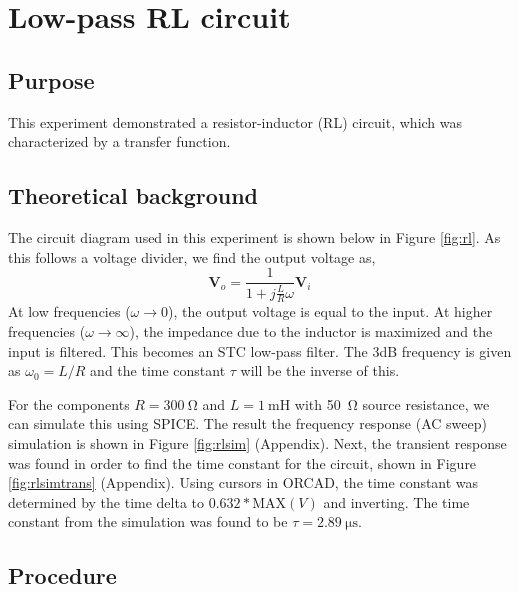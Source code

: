 \documentclass{report}
\begin{document}
\pagebreak

\section{Low-pass RL circuit}
\subsection{Purpose}
This experiment demonstrated a resistor-inductor (RL) circuit, which was characterized by a transfer function. 
\subsection{Theoretical background}
The circuit diagram used in this experiment is shown below in Figure \ref{fig:rl}. As this follows a voltage divider, we find the output voltage as, 
\begin{equation}
	\mathbf{V}_o = \frac{1}{1 + j \frac{L}{R} \omega} \mathbf{V}_i
\end{equation}
At low frequencies ($\omega \to 0$), the output voltage is equal to the input. At higher frequencies ($\omega \to \infty$), the impedance due to the inductor is maximized and the input is filtered. This becomes an STC low-pass filter. The 3dB frequency is given as $\omega_0 = L/R$ and the time constant $\tau$ will be the inverse of this. 

For the components $R=\SI{300}{\ohm}$ and $L=\SI{1}{\milli\henry}$ with \SI{50}{\ohm} source resistance, we can simulate this using SPICE. The result the frequency response (AC sweep) simulation is shown in Figure \ref{fig:rlsim} (Appendix). Next, the transient response was found in order to find the time constant for the circuit, shown in Figure \ref{fig:rlsimtrans} (Appendix). Using cursors in ORCAD, the time constant was determined by the time delta to $0.632*\mathrm{MAX}(V)$ and inverting. The time constant from the simulation was found to be $\tau=\SI{2.89}{\micro\second}$.



\subsection{Procedure}
\end{document}
